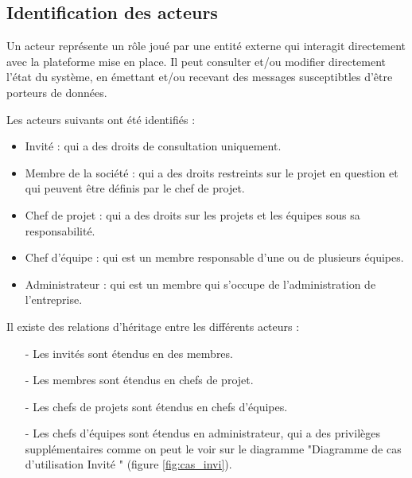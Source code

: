 \subsection{	Identification des acteurs}
\hspace{4mm}Un acteur représente un rôle joué par une entité externe qui interagit directement avec la plateforme mise en place. Il peut consulter et/ou modifier directement l’état du système, en émettant et/ou recevant des messages susceptibtles d’être porteurs de données. \cite{1}
\par Les acteurs suivants ont été identifiés :
\begin{itemize}
    \item 	Invité : qui a des droits de consultation uniquement.
    \item  Membre de la société : qui a des droits restreints sur le projet en question et qui peuvent être définis par le chef de projet.
    \item Chef de projet : qui a des droits sur les projets et les équipes sous sa responsabilité.
    \item	Chef d’équipe : qui est un membre responsable d’une ou de plusieurs équipes.
    \item 	Administrateur : qui est un membre qui s’occupe de l’administration de l’entreprise.
\end{itemize}
\par Il existe des relations d’héritage entre les différents acteurs :
\begin{itemize}
        \item[-] Les invités sont étendus en des membres.
        \item[-] Les membres sont étendus en chefs de projet.
        \item[-] Les chefs de projets sont étendus en chefs d'équipes.
        \item[-] Les chefs d’équipes sont étendus en administrateur, qui a des privilèges supplémentaires comme on peut le voir sur le diagramme "Diagramme de cas d’utilisation Invité " (figure \ref{fig:cas_invi}).
\end{itemize}
